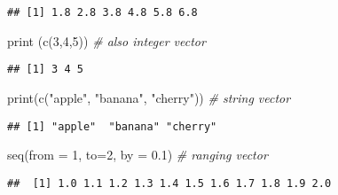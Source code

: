 \documentclass[
]{article}
\newenvironment{Shaded}{\begin{snugshade}}{\end{snugshade}}
\newcommand{\AttributeTok}[1]{\textcolor[rgb]{0.77,0.63,0.00}{#1}}
\newcommand{\CommentTok}[1]{\textcolor[rgb]{0.56,0.35,0.01}{\textit{#1}}}
\newcommand{\DecValTok}[1]{\textcolor[rgb]{0.00,0.00,0.81}{#1}}
\newcommand{\FloatTok}[1]{\textcolor[rgb]{0.00,0.00,0.81}{#1}}
\newcommand{\FunctionTok}[1]{\textcolor[rgb]{0.00,0.00,0.00}{#1}}
\newcommand{\NormalTok}[1]{#1}
\newcommand{\StringTok}[1]{\textcolor[rgb]{0.31,0.60,0.02}{#1}}
\begin{document}
\begin{verbatim}
## [1] 1.8 2.8 3.8 4.8 5.8 6.8
\end{verbatim}

\begin{Shaded}
\begin{Highlighting}[]
\FunctionTok{print}\NormalTok{ (}\FunctionTok{c}\NormalTok{(}\DecValTok{3}\NormalTok{,}\DecValTok{4}\NormalTok{,}\DecValTok{5}\NormalTok{)) }\CommentTok{\# also integer vector}
\end{Highlighting}
\end{Shaded}

\begin{verbatim}
## [1] 3 4 5
\end{verbatim}

\begin{Shaded}
\begin{Highlighting}[]
\FunctionTok{print}\NormalTok{(}\FunctionTok{c}\NormalTok{(}\StringTok{"apple"}\NormalTok{, }\StringTok{"banana"}\NormalTok{, }\StringTok{"cherry"}\NormalTok{)) }\CommentTok{\# string vector}
\end{Highlighting}
\end{Shaded}

\begin{verbatim}
## [1] "apple"  "banana" "cherry"
\end{verbatim}

\begin{Shaded}
\begin{Highlighting}[]
\FunctionTok{seq}\NormalTok{(}\AttributeTok{from =} \DecValTok{1}\NormalTok{, }\AttributeTok{to=}\DecValTok{2}\NormalTok{, }\AttributeTok{by =} \FloatTok{0.1}\NormalTok{) }\CommentTok{\# ranging vector}
\end{Highlighting}
\end{Shaded}

\begin{verbatim}
##  [1] 1.0 1.1 1.2 1.3 1.4 1.5 1.6 1.7 1.8 1.9 2.0
\end{verbatim}
\end{document}
